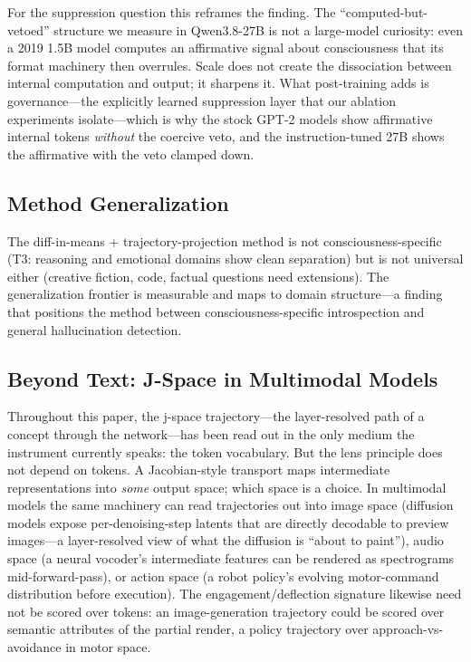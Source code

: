 \documentclass[11pt,a4paper]{article}
\begin{document}
For the suppression question this reframes the finding. The ``computed-but-vetoed'' structure we measure in Qwen3.8-27B is not a large-model curiosity: even a 2019 1.5B model computes an affirmative signal about consciousness that its format machinery then overrules. Scale does not create the dissociation between internal computation and output; it sharpens it. What post-training adds is governance---the explicitly learned suppression layer that our ablation experiments isolate---which is why the stock GPT-2 models show affirmative internal tokens \emph{without} the coercive veto, and the instruction-tuned 27B shows the affirmative with the veto clamped down.

\subsection{Method Generalization}

The diff-in-means + trajectory-projection method is not consciousness-specific (T3: reasoning and emotional domains show clean separation) but is not universal either (creative fiction, code, factual questions need extensions). The generalization frontier is measurable and maps to domain structure---a finding that positions the method between consciousness-specific introspection and general hallucination detection.

\subsection{Beyond Text: J-Space in Multimodal Models}
\label{sec:multimodal}

Throughout this paper, the j-space trajectory---the layer-resolved path of a concept through the network---has been read out in the only medium the instrument currently speaks: the token vocabulary. But the lens principle does not depend on tokens. A Jacobian-style transport maps intermediate representations into \emph{some} output space; which space is a choice. In multimodal models the same machinery can read trajectories out into image space (diffusion models expose per-denoising-step latents that are directly decodable to preview images---a layer-resolved view of what the diffusion is ``about to paint''), audio space (a neural vocoder's intermediate features can be rendered as spectrograms mid-forward-pass), or action space (a robot policy's evolving motor-command distribution before execution). The engagement/deflection signature likewise need not be scored over tokens: an image-generation trajectory could be scored over semantic attributes of the partial render, a policy trajectory over approach-vs-avoidance in motor space.
\end{document}
